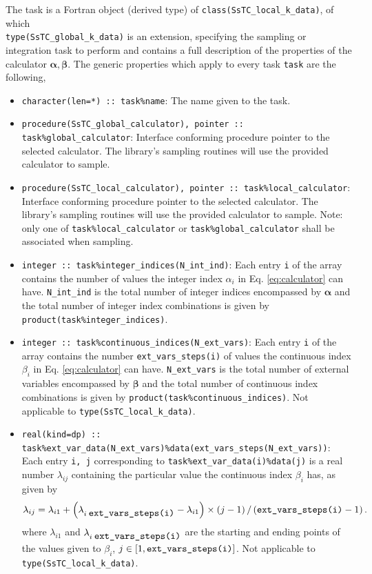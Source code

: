 \documentclass[10pt,a4paper]{article}
\begin{document}
The task is a Fortran object (derived type) of \verb|class(SsTC_local_k_data)|, of which \\ \verb|type(SsTC_global_k_data)| is an extension, specifying the sampling or integration task to perform and contains a full description of the properties of the calculator $\bm{\alpha},\bm{\beta}$. The generic properties which apply to every task \verb|task| are the following,
\begin{tcolorbox}\begin{itemize}
\item \verb|character(len=*) :: task%name|: The name given to the task.
\item \verb|procedure(SsTC_global_calculator), pointer :: task%global_calculator|: Interface conforming procedure pointer to the selected calculator. The library's sampling routines will use the provided calculator to sample.
\item \verb|procedure(SsTC_local_calculator), pointer :: task%local_calculator|: Interface conforming procedure pointer to the selected calculator. The library's sampling routines will use the provided calculator to sample. Note: only one of \verb|task%local_calculator| or \verb|task%global_calculator| shall be associated when sampling.
\item \verb|integer :: task%integer_indices(N_int_ind)|: Each entry \verb|i| of the array contains the number of values the integer index $\alpha_i$ in Eq. \eqref{eq:calculator} can have. \verb|N_int_ind| is the total number of integer indices encompassed by $\bm{\alpha}$ and the total number of integer index combinations is given by \verb|product(task%integer_indices)|.
\item \verb|integer :: task%continuous_indices(N_ext_vars)|: Each entry \verb|i| of the array contains the number \verb|ext_vars_steps(i)| of values the continuous index $\beta_i$ in Eq. \eqref{eq:calculator} can have. \verb|N_ext_vars| is the total number of external variables encompassed by $\bm{\beta}$ and the total number of continuous index combinations is given by \verb|product(task%continuous_indices)|. Not applicable to \verb|type(SsTC_local_k_data)|.
\item \verb|real(kind=dp) :: task%ext_var_data(N_ext_vars)%data(ext_vars_steps(N_ext_vars))|: Each entry \verb|i, j| corresponding to \verb|task%ext_var_data(i)%data(j)| is a real number $\lambda_{ij}$ containing the particular value the continuous index $\beta_{i}$ has, as given by
\begin{equation}\label{eq:disc_cont}
\lambda_{ij} = \lambda_{i1} + \left(\lambda_{i\;\verb|ext_vars_steps(i)|} - \lambda_{i1}\right)\times\left(j - 1\right)/\left(\verb|ext_vars_steps(i)| - 1\right).
\end{equation}
where $\lambda_{i1}$ and $\lambda_{i\;\verb|ext_vars_steps(i)|}$ are the starting and ending points of the values given to $\beta_{i}$, $j\in [1, \verb|ext_vars_steps(i)|]$. Not applicable to \verb|type(SsTC_local_k_data)|.
\end{itemize}\end{tcolorbox}
\end{document}
